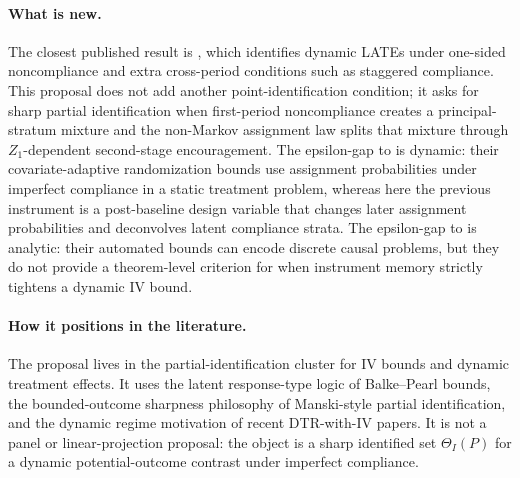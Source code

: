 \documentclass[11pt]{article}
\theoremstyle{definition}
\theoremstyle{plain}
\theoremstyle{remark}
\begin{document}
\paragraph{What is new.}
The closest published result is \citet{SojitraSyrgkanis2024}, which identifies dynamic LATEs under one-sided noncompliance and extra cross-period conditions such as staggered compliance.  This proposal does not add another point-identification condition; it asks for sharp partial identification when first-period noncompliance creates a principal-stratum mixture and the non-Markov assignment law splits that mixture through \(Z_1\)-dependent second-stage encouragement.  The epsilon-gap to \citet{BugniGaoObradovicVelez2024} is dynamic: their covariate-adaptive randomization bounds use assignment probabilities under imperfect compliance in a static treatment problem, whereas here the previous instrument is a post-baseline design variable that changes later assignment probabilities and deconvolves latent compliance strata.  The epsilon-gap to \citet{DuarteFinkelsteinKnoxMummoloShpitser2024} is analytic: their automated bounds can encode discrete causal problems, but they do not provide a theorem-level criterion for when instrument memory strictly tightens a dynamic IV bound.

\paragraph{How it positions in the literature.}
The proposal lives in the partial-identification cluster for IV bounds and dynamic treatment effects.  It uses the latent response-type logic of Balke--Pearl bounds, the bounded-outcome sharpness philosophy of Manski-style partial identification, and the dynamic regime motivation of recent DTR-with-IV papers.  It is not a panel or linear-projection proposal: the object is a sharp identified set \(\Theta_I(P)\) for a dynamic potential-outcome contrast under imperfect compliance.
\end{document}
